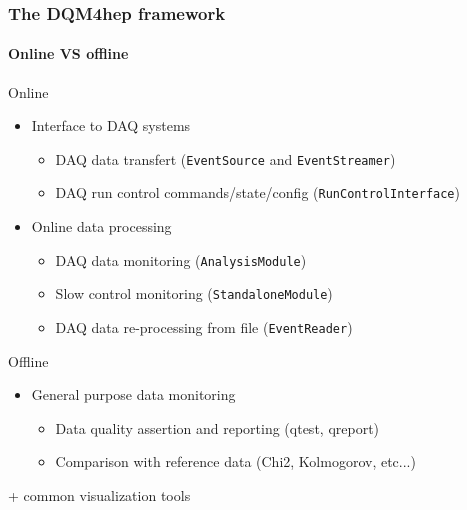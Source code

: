 \documentclass[presentation, 10pt]{beamer}
\begin{document}
\begin{frame}
  \frametitle{The DQM4hep framework}
  \framesubtitle{Online VS offline}
  \footnotesize
  \begin{block}{Online}
    \begin{itemize}
      \item Interface to DAQ systems
      \begin{itemize}
        \scriptsize
        \item DAQ data transfert (\texttt{EventSource} and \texttt{EventStreamer})
        \item DAQ run control commands/state/config (\texttt{RunControlInterface})
      \end{itemize}
      \item Online data processing
      \begin{itemize}
        \scriptsize
        \item DAQ data monitoring (\texttt{AnalysisModule})
        \item Slow control monitoring (\texttt{StandaloneModule})
        \item DAQ data re-processing from file (\texttt{EventReader})
      \end{itemize}
    \end{itemize}
  \end{block}
  \begin{block}{Offline}
    \begin{itemize}
      \item General purpose data monitoring
      \begin{itemize}
        \scriptsize
        \item Data quality assertion and reporting (qtest, qreport)
        \item Comparison with reference data (Chi2, Kolmogorov, etc...)
      \end{itemize}
    \end{itemize}
  \end{block}
  + common visualization tools
\end{frame}
\end{document}
